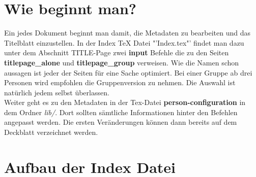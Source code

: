 \section{Wie beginnt man?}

Ein jedes Dokument beginnt man damit, die Metadaten zu bearbeiten und das Titelblatt einzustellen. In der Index TeX Datei "'Index.tex"' findet man dazu unter dem Abschnitt TITLE-Page zwei \textbf{input} Befehle die zu den Seiten \textbf{titlepage\_alone} und \textbf{titlepage\_group} verweisen. Wie die Namen schon aussagen ist jeder der Seiten für eine Sache optimiert. Bei einer Gruppe ab drei Personen wird empfohlen die Gruppenversion zu nehmen. Die Auswahl ist natürlich jedem selbst überlassen.\\

Weiter geht es zu den Metadaten in der Tex-Datei \textbf{person-configuration} in dem Ordner \emph{lib/}. Dort sollten sämtliche Informationen hinter den Befehlen angepasst werden. Die ersten Veränderungen können dann bereits auf dem Deckblatt verzeichnet werden.


\section{Aufbau der Index Datei}

